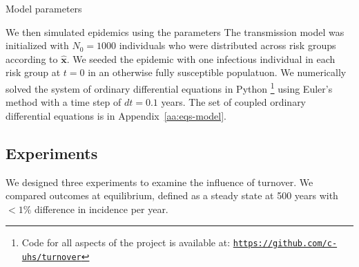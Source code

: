 \begin{table}
  \centering
  \caption{Model parameters}
  \label{tab:params}
  
\end{table}
\par
We then simulated epidemics using the parameters %
The transmission model was initialized with $N_0 = 1000$ individuals
who were distributed across risk groups according to $\bm{\hat{x}}$.
We seeded the epidemic with
one infectious individual in each risk group at $t = 0$ in an otherwise 
fully susceptible populatuon.
We numerically solved the system of ordinary differential equations			%
in Python%
\footnote{Code for all aspects of the project is available at:
  \href{https://github.com/c-uhs/turnover}{\texttt{https://github.com/c-uhs/turnover}}}
using Euler's method with a time step of $dt = 0.1$ years.
The set of coupled ordinary differential equations is in Appendix~\ref{aa:eqs-model}.		%

\subsection{Experiments}
\label{ss:exp}
We designed three experiments to examine the influence of turnover.
We compared outcomes at equilibrium,
defined as a steady state at 500 years with $<1\%$ difference in incidence per year.

